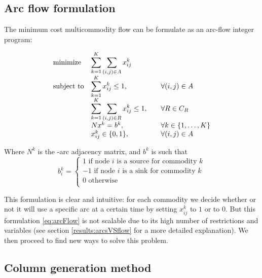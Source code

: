 \documentclass[14pt,a4paper]{article}
\theoremstyle{definition}
\numberwithin{equation}{subsection}
\begin{document}
\subsection{Arc flow formulation}

The minimum cost multicommodity flow can be formulate as an arc-flow integer program: 

\begin{equation}
\begin{array}{ll@{}ll}
\text{minimize}  & \displaystyle\sum\limits_{k=1}^{K}\sum_{(i,j)\in A} x_{ij}^k &\\
\text{subject to}& \displaystyle\sum\limits_{k=1}^{K}   x_{ij}^k \leq 1,  &\forall (i,j) \in A \\
& \displaystyle\sum\limits_{k=1}^{K}\sum_{(i,j) \in R}   x_{ij}^k \leq 1, \quad \quad  &\forall R \in C_R \\
& Nx^k = b^k,  &\forall k \in \{1,\ldots,K\}\\
&                                                x_{ij}^k \in \{0,1\}, & \forall (i,j)\in A
\end{array}
\label{eq:arcFlow}
\end{equation}

Where $N^k$ is the -arc adjacency matrix, and $b^k$ is such that 
\[
b^k_i=\left\{
\begin{array}{ll}
1 \text{ if node } i \text{ is a source for commodity } k\\
-1 \text{ if node } i \text{ is a sink for commodity } k\\
0 \text{ otherwise}\\
\end{array}
\right.
\]



This formulation is clear and intuitive: for each commodity we decide whether or not it will use a specific arc at a certain time by setting $x_{ij}^k$ to $1$ or to $0$. But this formulation \eqref{eq:arcFlow} is not scalable due to its high number of restrictions and variables (see section \ref{results:arcsVSflow} for a more detailed explanation). We then proceed to find new ways to solve this problem.









\subsection{Column generation method}
\end{document}
